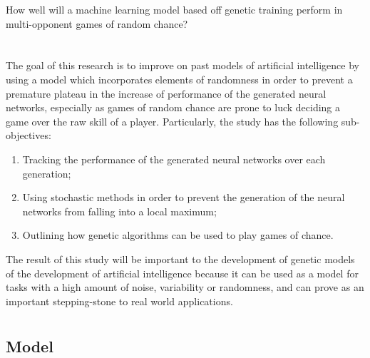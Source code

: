 \documentclass[]{article}
\begin{document}
	How well will a machine learning model based off genetic training perform in multi-opponent games of random chance?
	
	\sec
	
	\section*{}
	
	The goal of this research is to improve on past models of artificial intelligence by using a model which incorporates elements of randomness in order to prevent a premature plateau in the increase of performance of the generated neural networks, especially as games of random chance are prone to luck deciding a game over the raw skill of a player. Particularly, the study has the following sub-objectives:
	
	\begin{enumerate}
		\item Tracking the performance of the generated neural networks over each generation;
		\item Using stochastic methods in order to prevent the generation of the neural networks from falling into a local maximum;
		\item Outlining how genetic algorithms can be used to play games of chance.
		
	\end{enumerate}
	
	The result of this study will be important to the development of genetic models of the development of artificial intelligence because it can be used as a model for tasks with a high amount of noise, variability or randomness, and can prove as an important stepping-stone to real world applications. 
	
	\section*{}

    \subsection*{Model}
    \subsection*{}
	
\end{document}
